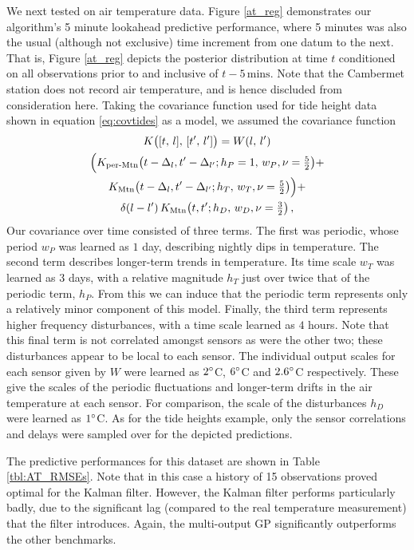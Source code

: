 \documentclass{acmtrans2m}
\newcommand{\dnt}[1]{_{{#1}}}
\newcommand{\Kl}[1]{K_{\text{#1}}}
\begin{document}
We next tested on air temperature data. Figure \ref{at_reg} demonstrates our algorithm's 5 minute lookahead predictive performance, where 5 minutes was also the usual (although not exclusive) time increment from one datum to the next. That is, Figure \ref{at_reg} depicts the posterior distribution at time $t$ conditioned on all observations prior to and inclusive of $t-5\,\text{mins}$. Note that the Cambermet station does not record air temperature, and is hence discluded from consideration here. Taking the covariance function used for tide height data shown in equation \eqref{eq:covtides} as a model, we assumed the covariance function
\begin{multline*} %
 K\bigl([t,\,l],\,[t',\,l']\bigr)={W}(l,\,l')\\
\Bigl(
\Kl{per-Mtn}\bigl(t-\Delta_{l},t'-\Delta_{l'};h\dnt{P}=1,\,w_P,\nu=\tfrac{5}{2}\bigr)+
\\
\Kl{Mtn}\bigl(t-\Delta_{l},t'-\Delta_{l'};h\dnt{T},\,w\dnt{T},\nu=\tfrac{5}{2}\bigr)
\Bigr)+
\\
\dd{l}{l'}\Kl{Mtn}\bigl(t,t';h\dnt{D},\,w\dnt{D},\nu=\tfrac{3}{2}\bigr)
\,,
\end{multline*}
Our covariance over time consisted of three terms. The first was periodic, whose period $w_P$ was learned as $1$ day, describing nightly dips in temperature. The second term describes longer-term trends in temperature. Its time scale $w\dnt{T}$ was learned as $3$ days, with a relative magnitude $h\dnt{T}$ just over twice that of the periodic term, $h\dnt{P}$. From this we can induce that the periodic term represents only a relatively minor component of this model. Finally, the third term represents higher frequency disturbances, with a time scale learned as $4$ hours. Note that this final term is not correlated amongst sensors as were the other two; these disturbances appear to be local to each sensor. The individual output scales for each sensor given by $W$ were learned as $2^\circ$C, $6^\circ$C and $2.6^\circ$C respectively. These give the scales of the periodic fluctuations and longer-term drifts in the air temperature at each sensor. For comparison, the scale of the disturbances $h\dnt{D}$ were learned as $1^\circ$C. As for the tide heights example, only the sensor correlations and delays were sampled over for the depicted predictions.

The predictive performances for this dataset are shown in Table \ref{tbl:AT_RMSEs}. Note that in this case a history of 15 observations proved optimal for the Kalman filter. However, the Kalman filter performs particularly badly, due to the significant lag (compared to the real temperature measurement) that the filter introduces. Again, the multi-output GP significantly outperforms the other benchmarks.
\end{document}
